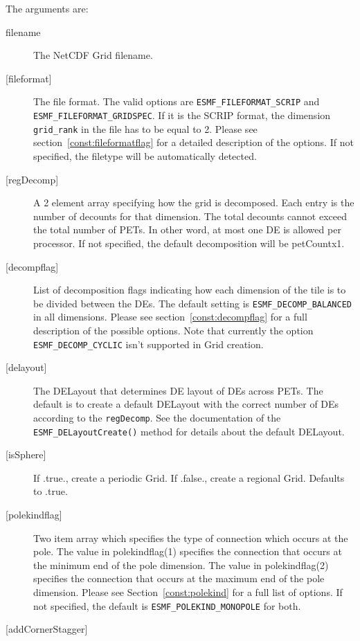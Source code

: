    The arguments are:
   \begin{description}
   \item[filename]
       The NetCDF Grid filename.
   \item[{[fileformat]}]
       The file format.  The valid options are {\tt ESMF\_FILEFORMAT\_SCRIP} and {\tt ESMF\_FILEFORMAT\_GRIDSPEC}.
       If it is the SCRIP format, the dimension {\tt grid\_rank} in the file has to be equal to 2.
       Please see section~\ref{const:fileformatflag} for a detailed
       description of the options. If not specified, the filetype will be automatically detected.
   \item[{[regDecomp]}]
        A 2 element array specifying how the grid is decomposed.
        Each entry is the number of decounts for that dimension.
        The total decounts cannot exceed the total number of PETs.  In other
        word, at most one DE is allowed per processor.
        If not specified, the default decomposition will be petCountx1.
   \item[{[decompflag]}]
        List of decomposition flags indicating how each dimension of the
        tile is to be divided between the DEs. The default setting
        is {\tt ESMF\_DECOMP\_BALANCED} in all dimensions. Please see
        section~\ref{const:decompflag} for a full description of the
        possible options. Note that currently the option
        {\tt ESMF\_DECOMP\_CYCLIC} isn't supported in Grid creation.
   \item[{[delayout]}]
        The DELayout that determines DE layout of DEs across PETs. The default is to create a default
        DELayout with the correct number of DEs according to the {\tt regDecomp}. See the documentation of
        the {\tt ESMF\_DELayoutCreate()} method for details about the default DELayout.
   \item[{[isSphere]}]
        If .true., create a periodic Grid. If .false., create a regional Grid. Defaults to .true.
   \item[{[polekindflag]}]
        Two item array which specifies the type of connection which occurs at the pole. The value in polekindflag(1)
        specifies the connection that occurs at the minimum end of the pole dimension. The value in polekindflag(2)
        specifies the connection that occurs at the maximum end of the pole dimension. Please see
        Section~\ref{const:polekind} for a full list of options. If not specified,
        the default is {\tt ESMF\_POLEKIND\_MONOPOLE} for both.
   \item[{[addCornerStagger]}]

\end{description}
